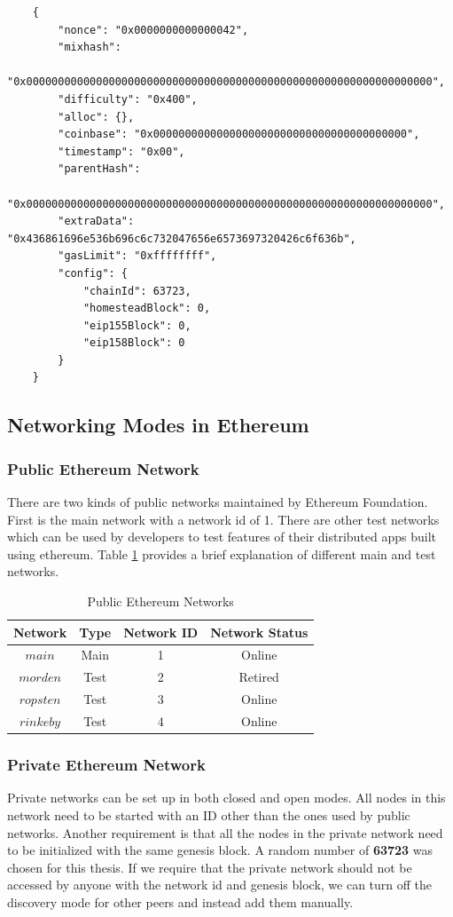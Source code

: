 \documentclass[11pt,openright]{report}
\begin{document}
\begin{verbatim}
    {
        "nonce": "0x0000000000000042",
        "mixhash": 
        "0x0000000000000000000000000000000000000000000000000000000000000000",
        "difficulty": "0x400",
        "alloc": {}, 
        "coinbase": "0x0000000000000000000000000000000000000000",
        "timestamp": "0x00",
        "parentHash": 
        "0x0000000000000000000000000000000000000000000000000000000000000000",
        "extraData": "0x436861696e536b696c6c732047656e6573697320426c6f636b",
        "gasLimit": "0xffffffff",
        "config": {
            "chainId": 63723,
            "homesteadBlock": 0,
            "eip155Block": 0,
            "eip158Block": 0
        }
    }
\end{verbatim}

\subsection{Networking Modes in Ethereum}
\subsubsection{Public Ethereum Network}
There are two kinds of public networks maintained by Ethereum Foundation. 
First is the main network with a network id of 1. There are other test networks which can be used by developers to test features of their distributed apps built using ethereum. Table \ref{pub_eth_networks} provides a brief explanation of different main and test networks. 

\begin{table}[!htbp]
	\renewcommand{\arraystretch}{1.3}
	\caption{Public Ethereum Networks}
	\label{pub_eth_networks}
	\centering
	\begin{tabular}{|c||c|c|c|}
		\hline
		\bfseries Network & \bfseries Type & \bfseries Network ID & \bfseries Network Status \\
		\hline\hline
		$main$ & Main & 1 & Online \\ \hline
		$morden$ & Test & 2 & Retired \\ \hline
		$ropsten$ & Test & 3 & Online \\ \hline
		$rinkeby$ & Test & 4 & Online \\ \hline
	\end{tabular}
\end{table}

\subsubsection{Private Ethereum Network}
Private networks can be set up in both closed and open modes. All nodes in this network need to be started with an ID other than the ones used by public networks. Another requirement is that all the nodes in the private network need to be initialized with the same genesis block. A random number of \textbf{63723} was chosen for this thesis. If we require that the private network should not be accessed by anyone with the network id and genesis block, we can turn off the discovery mode for other peers and instead add them manually.
\end{document}
